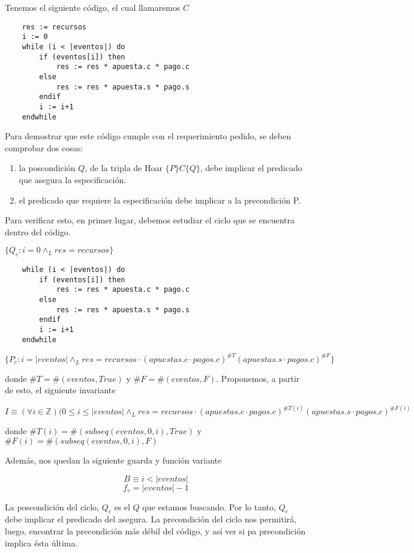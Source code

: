 \documentclass[../document.tex]{subfiles}
\begin{document}
Tenemos el siguiente código, el cual llamaremos $C$
\begin{verbatim}
    res := recursos
    i := 0
    while (i < |eventos|) do
        if (eventos[i]) then
            res := res * apuesta.c * pago.c
        else
            res := res * apuesta.s * pago.s
        endif
        i := i+1
    endwhile
\end{verbatim}

Para demostrar que este código cumple con el requerimiento pedido, se deben comprobar dos cosas:

\begin{enumerate}
    \item la poscondición $Q$, de la tripla de Hoar $\{P\}C\{Q\}$, debe implicar el predicado que asegura la especificación.
    \item el predicado que requiere la especificación debe implicar a la precondición {P}.
\end{enumerate}

Para verificar esto, en primer lugar, debemos estudiar el ciclo que se encuentra dentro del código.

$\{Q_c: i = 0 \land_{L} res = recursos\}$
\begin{verbatim}
    while (i < |eventos|) do
        if (eventos[i]) then
            res := res * apuesta.c * pago.c
        else
            res := res * apuesta.s * pago.s
        endif
        i := i+1
    endwhile
\end{verbatim}
$\{P_c: i = |eventos| \land_{L} res = recursos \cdot (apuestas.c\cdot pagos.c)^{\#T}(apuestas.s\cdot pagos.c)^{\#F}\}$

donde $\#T = \#(eventos, True)$ y $\#F = \#(eventos, F)$. Proponemos, a partir de esto, el siguiente invariante

$$I \equiv (\forall i \in \mathbb{Z})(0\leq i \leq |eventos| \land_L res = recursos \cdot (apuestas.c\cdot pagos.c)^{\#T(i)}(apuestas.s\cdot pagos.c)^{\#F(i)}$$

donde $\#T(i) = \#(subseq(eventos,0,i), True)$ y $\#F(i) = \#(subseq(eventos,0,i), F)$

Además, nos quedan la siguiente guarda y función variante

$$B \equiv i < |eventos|$$
$$f_v = |eventos|-1$$

La poscondición del ciclo, $Q_c$ es el $Q$ que estamos buscando. Por lo tanto, $Q_c$ debe implicar el predicado del asegura. La precondición del ciclo nos permitirá, luego, encontrar la precondición más débil del código, y así ver si pa precondición implica ésta última.
\end{document}
